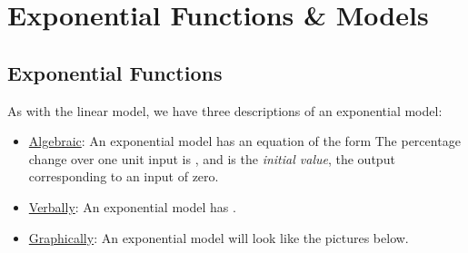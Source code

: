 \documentclass[notes]{subfiles}
\begin{document}
	\fancyhead[LO,RE]{\bfseries \currentname}
	\fancyfoot[C]{{}}
	\fancyfoot[RO,LE]{\large \thepage}	%

\section*{Exponential Functions \& Models}\label{cs15}
	\subsection*{Exponential Functions}
		As with the linear model, we have three descriptions of an exponential model:\\
		\begin{itemize}
			\item \underline{Algebraic}: An exponential model has an equation of the form   The percentage change over one unit input is , and  is the \emph{initial value}, the output corresponding to an input of zero.\\
			\item \underline{Verbally}: An exponential model has .
			\item \underline{Graphically}: An exponential model will look like the pictures below.
		\end{itemize}
\end{document}
